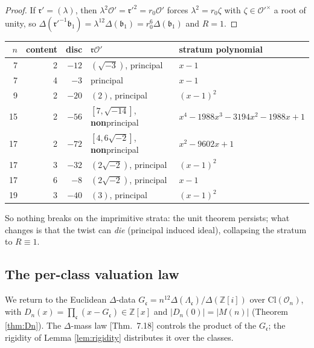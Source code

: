 \documentclass[11pt]{amsart}
\numberwithin{equation}{section}
\theoremstyle{plain}
\theoremstyle{definition}
\theoremstyle{remark}
\newcommand{\Z}{\mathbb{Z}}
\newcommand{\Zi}{\Z[i]}
\newcommand{\Cl}{\mathrm{Cl}}
\newcommand{\idealb}{\mathfrak{b}}
\newcommand{\idealc}{\mathfrak{c}}
\newcommand{\idealr}{\mathfrak{r}}
\newcommand{\lat}[1]{\left[#1\right]}
\newcommand{\Oc}{\mathcal{O}}
\newcommand{\PaperI}{\cite{SchmidtI}}
\begin{document}
\begin{proof}
If $\idealr' = (\lambda)$, then $\lambda^2\Oc' = \idealr'^2 = r_0\Oc'$
forces $\lambda^2 = r_0\zeta$ with $\zeta \in \Oc'^\times$ a root of
unity, so $\Delta(\idealr'^{-1}\idealb_1) = \lambda^{12}\Delta(\idealb_1)
= r_0^6\Delta(\idealb_1)$ and $R = 1$.
\end{proof}

\begin{center}
\footnotesize
\setlength{\tabcolsep}{3pt}
\begin{tabular}{@{}rrrll@{}}
\toprule
$n$ & content & disc & $\idealr\Oc'$ & stratum polynomial\\
\midrule
7 & 2 & $-12$ & $(\sqrt{-3})$, principal & $x - 1$\\
7 & 4 & $-3$ & principal & $x - 1$\\
9 & 2 & $-20$ & $(2)$, principal & $(x - 1)^2$\\
15 & 2 & $-56$ & $\lat{7, \sqrt{-14}}$, \textbf{non}principal &
$x^4 - 1988x^3 - 3194x^2 - 1988x + 1$\\
17 & 2 & $-72$ & $\lat{4, 6\sqrt{-2}}$, \textbf{non}principal &
$x^2 - 9602x + 1$\\
17 & 3 & $-32$ & $(2\sqrt{-2})$, principal & $(x - 1)^2$\\
17 & 6 & $-8$ & $(2\sqrt{-2})$, principal & $x - 1$\\
19 & 3 & $-40$ & $(3)$, principal & $(x - 1)^2$\\
\bottomrule
\end{tabular}
\end{center}
So nothing breaks on the imprimitive strata: the unit theorem persists;
what changes is that the twist can \emph{die} (principal induced ideal),
collapsing the stratum to $R \equiv 1$.

\subsection{The per-class valuation law}\label{subsec:perclass}

We return to the Euclidean $\Delta$-data $G_\idealc = n^{12}\Delta(
\Lambda_\idealc)/\Delta(\Zi)$ over $\Cl(\Oc_n)$, with $D_n(x) =
\prod_\idealc(x - G_\idealc) \in \Z[x]$ and $|D_n(0)| = |M(n)|$ (Theorem
\ref{thm:Dn}).  The $\Delta$-mass law \PaperI[Thm.~7.18] controls the
product of the $G_\idealc$; the rigidity of Lemma \ref{lem:rigidity}
distributes it over the classes.
\end{document}
